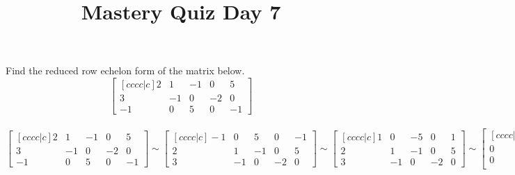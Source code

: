 \documentclass{sbgLAquiz}
\title{Mastery Quiz Day 7 }
\begin{document}
\begin{problem}
Find the reduced row echelon form of the matrix below.
$$\begin{bmatrix}[cccc|c] 2 & 1 & -1 & 0 & 5 \\ 3 & -1 & 0 & -2 & 0 \\ -1 & 0 & 5 & 0 & -1 \end{bmatrix}$$
\end{problem}
\begin{solution}
$$\begin{bmatrix}[cccc|c]
 2 & 1 & -1 & 0 & 5 \\
 3 & -1 & 0 & -2 & 0 \\
 -1 & 0 & 5 & 0 & -1 
\end{bmatrix} \sim
\begin{bmatrix}[cccc|c]
 -1 & 0 & 5 & 0 & -1  \\
 2 & 1 & -1 & 0 & 5 \\
 3 & -1 & 0 & -2 & 0 
\end{bmatrix} \sim
\begin{bmatrix}[cccc|c]
 1 & 0 & -5 & 0 & 1 \\
 2 & 1 & -1 & 0 & 5 \\
 3 & -1 & 0 & -2 & 0 
\end{bmatrix} \sim
\begin{bmatrix}[cccc|c]
 1 & 0 & -5 & 0 & 1  \\
 0 & 1 & 9 & 0 & 3 \\
 0 & -1 & 15 & -2 & -3 \\
\end{bmatrix} \sim
\begin{bmatrix}[cccc|c]
 1 & 0 & -5 & 0 & 1  \\
 0 & 1 & 9 & 0 & 3 \\
 0 & 0 & 24 & -2 & 0 \\
\end{bmatrix} \sim
\begin{bmatrix}[cccc|c]
 1 & 0 & -5 & 0 & 1 \\
 0 & 1 & 9 & 0 & 3 \\
 0 & 0 & 1 & -\frac{1}{12} & 0 \\
\end{bmatrix} \sim
\begin{bmatrix}[cccc|c] 
1 & 0 & 0 & -\frac{5}{12} & 1 \\
 0 & 1 & 0 & \frac{3}{4} & 3 \\ 
 0 & 0 & 1 & -\frac{1}{12} & 0 
\end{bmatrix}$$
\end{solution}
\end{document}

